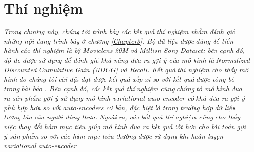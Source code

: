 \chapter{Thí nghiệm}
\label{Chapter4}

\textit{Trong chương này, chúng tôi trình bày các kết quả thí nghiệm nhằm đánh giá những nội dung trình bày ở chương \ref{Chapter3}. Bộ dữ liệu được dùng để tiến hành các thí nghiệm là bộ Movielens-20M \cite{Ml20M} và Million Song Dataset\cite{MSD}; bên cạnh đó, độ đo được sử dụng để đánh giá khả năng đưa ra gợi ý của mô hình là Normalized Discounted Cumulative Gain (NDCG) và  Recall. Kết quả thí nghiệm cho thấy mô hình do chúng tôi cài đặt đạt được kết quả xấp xỉ so với kết quả được công bố trong bài báo \cite{mvae}. Bên cạnh đó, các kết quả thí nghiệm cũng chứng tỏ mô hình đưa ra sản phẩm gợi ý sử dụng mô hình variational auto-encoder có khả đưa ra gợi ý phù hợp hơn so với auto-encoders cơ bản, đặc biệt là trong trường hợp dữ liệu tương tác của người dùng thưa. Ngoài ra, các kết quả thí nghiệm cũng cho thấy việc thay đổi hàm mục tiêu giúp mô hình đưa ra kết quả tốt hơn cho bài toán gợi ý sản phẩm so với các hàm mục tiêu thường được sử dụng khi huấn luyện variational auto-encoder}


